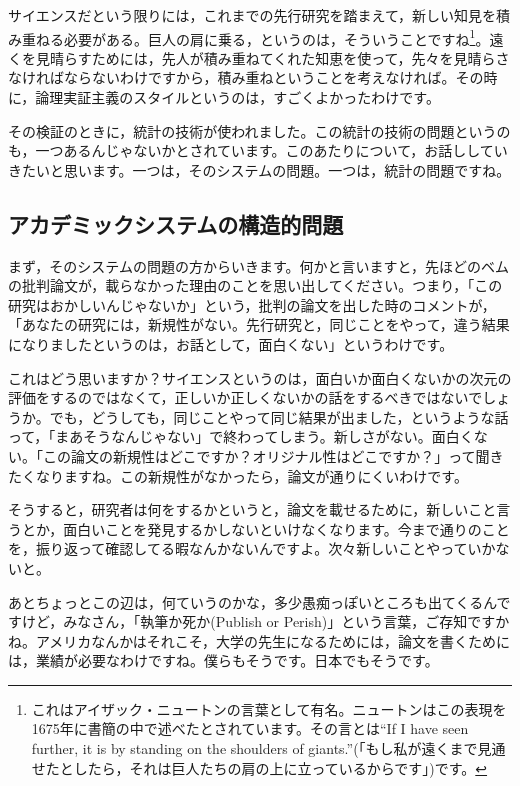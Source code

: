 \documentclass{ltjsbook}
\begin{document}
サイエンスだという限りには，これまでの先行研究を踏まえて，新しい知見を積み重ねる必要がある。巨人の肩に乗る，というのは，そういうことですね\footnote{これはアイザック・ニュートンの言葉として有名。ニュートンはこの表現を1675年に書簡の中で述べたとされています。その言とは``If I have seen further, it is by standing on the shoulders of giants.''(「もし私が遠くまで見通せたとしたら，それは巨人たちの肩の上に立っているからです」)です。}。遠くを見晴らすためには，先人が積み重ねてくれた知恵を使って，先々を見晴らさなければならないわけですから，積み重ねということを考えなければ。その時に，論理実証主義のスタイルというのは，すごくよかったわけです。

その検証のときに，統計の技術が使われました。この統計の技術の問題というのも，一つあるんじゃないかとされています。このあたりについて，お話ししていきたいと思います。一つは，そのシステムの問題。一つは，統計の問題ですね。

\subsection{アカデミックシステムの構造的問題}
まず，そのシステムの問題の方からいきます。何かと言いますと，先ほどのベムの批判論文が，載らなかった理由のことを思い出してください。つまり，「この研究はおかしいんじゃないか」という，批判の論文を出した時のコメントが，「あなたの研究には，新規性がない。先行研究と，同じことをやって，違う結果になりましたというのは，お話として，面白くない」というわけです。

これはどう思いますか？サイエンスというのは，面白いか面白くないかの次元の評価をするのではなくて，正しいか正しくないかの話をするべきではないでしょうか。でも，どうしても，同じことやって同じ結果が出ました，というような話って，「まあそうなんじゃない」で終わってしまう。新しさがない。面白くない。「この論文の新規性はどこですか？オリジナル性はどこですか？」って聞きたくなりますね。この新規性がなかったら，論文が通りにくいわけです。

そうすると，研究者は何をするかというと，論文を載せるために，新しいこと言うとか，面白いことを発見するかしないといけなくなります。今まで通りのことを，振り返って確認してる暇なんかないんですよ。次々新しいことやっていかないと。

あとちょっとこの辺は，何ていうのかな，多少愚痴っぽいところも出てくるんですけど，みなさん，「執筆か死か(Publish or Perish)」という言葉，ご存知ですかね。アメリカなんかはそれこそ，大学の先生になるためには，論文を書くためには，業績が必要なわけですね。僕らもそうです。日本でもそうです。
\end{document}
